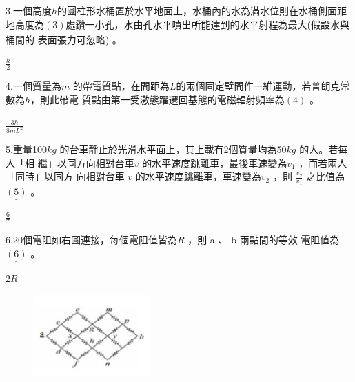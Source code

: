 \documentclass[cn,10pt,math=newtx,chinesefont=founder,device=ig]{elegantbook}
\begin{document}
\begin{example}
   3.一個高度$h$的圓柱形水桶置於水平地面上，水桶內的水為滿水位則在水桶側面距地高度為$\underline{(3)}$處鑽一小孔，水由孔水平噴出所能達到的水平射程為最大(假設水與桶間的
表面張力可忽略) 。\\
    \rightline{[文華高中教甄109]}
\end{example}
\begin{solution}
    $\frac{h} {2}$
\end{solution}

\newpage


\begin{example}
   4.一個質量為$m$ 的帶電質點，在間距為$ L$的兩個固定壁間作一維運動，若普朗克常數為$h$，則此帶電 質點由第一受激態躍遷回基態的電磁輻射頻率為$\underline{(4)}$ 。\\
    \rightline{[文華高中教甄109]}
\end{example}
\begin{solution}
    $\frac{3h} {8mL^2}$
\end{solution}

\newpage


\begin{example}
   5.重量100$ kg$ 的台車靜止於光滑水平面上，其上載有2個質量均為50$kg$ 的人。若每人「相
繼」以同方向相對台車$ v$ 的水平速度跳離車，最後車速變為$v _1$ ，而若兩人「同時」以同方
向相對台車 $v$ 的水平速度跳離車，車速變為$v_2$ ，則 $\frac{v_2}{v_1}$ 之比值為$\underline{(5)}$ 。\\
    \rightline{[文華高中教甄109]}
\end{example}
\begin{solution}
    $\frac{6}{7}$
\end{solution}

\newpage

\begin{example}
   6.20個電阻如右圖連接，每個電阻值皆為$ R$ ，則 a 、 b 兩點間的等效
電阻值為$\underline{(6)} $ 。
\\
    \rightline{[文華高中教甄109]}
\end{example}
\begin{solution}
    $2R$
\end{solution}
\begin{figure}[htbp]
    \flushright
    \includegraphics[width=0.4\textwidth]{image/109文華6.png}
  \end{figure}
\newpage
\end{document}
